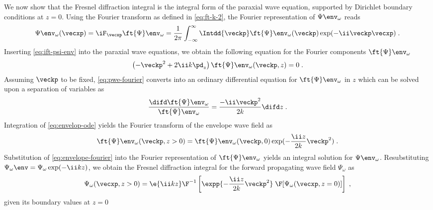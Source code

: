 \documentclass[
twoside,
openright,
titlepage,
numbers=noenddot,
headinclude,
fleqn,
a4paper,
footinclude=true,
cleardoublepage=empty,
abstractoff,
BCOR=5mm,
paper=a4,
fontsize=11pt,
british,ngerman,american,
]{scrreprt}
\begin{document}
We now show that the Fresnel diffraction integral is the integral form
of the paraxial wave equation, supported by Dirichlet boundary
conditions at $z=0$.  Using the Fourier transform as defined in
\cref{eq:ft-k-2}, the Fourier representation of $\Psi\env_{\omega}$
reads
\begin{equation}
  \label{eq:ift-psi-env}
  \Psi\env_{\omega}(\vecxp)  = \iF_{\vecxp} \ft{\Psi}\env_{\omega} = 
  \frac{1}{2\pi}\int_{-\infty}^\infty \Intdd{\veckp} 
  \ft{\Psi}\env_{\omega}(\veckp) \exp(-\ii\veckp\vecxp) \;.
\end{equation}
Inserting \cref{eq:ift-psi-env} into the paraxial wave equations, we
obtain the following equation for the Fourier components
$\ft{\Psi}\env_{\omega}$
\begin{equation}
  \label{eq:pwe-fourier}
  \left( -\veckp^2  +2\ii k\pd_z \right)
  \ft{\Psi}\env_{\omega}(\veckp,z) = 0\;. 
\end{equation}
Assuming $\veckp$ to be fixed, \cref{eq:pwe-fourier} converts into an
ordinary differential equation for $\ft{\Psi}\env_\omega$ in $z$ which
can be solved upon a separation of variables as
\begin{equation}
  \label{eq:envelop-ode}
  \frac{\difd\ft{\Psi}\env_\omega}{\ft{\Psi}\env_\omega} 
  = \frac{-\ii \veckp^2}{2 k} \difd z \;.
\end{equation}
Integration of \cref{eq:envelop-ode} yields the Fourier transform of
the envelope wave field as
\begin{equation}
  \label{eq:envelope-fourier}
  \ft{\Psi}\env_\omega(\veckp,z>0) 
  = \ft{\Psi}\env_\omega(\veckp,0)\exp(-\frac{\ii z}{2 k}\veckp^2) \;.
\end{equation}
Substitution of \cref{eq:envelope-fourier} into the Fourier
representation of $\ft{\Psi}\env_\omega$ yields an integral solution
for $\Psi\env_{\omega}$.  Resubstituting $\Psi_{\omega}\env=
\Psi_{\omega}\exp(-\ii k z)$, we obtain the Fresnel diffraction
integral for the forward propagating wave field $\Psi_{\omega}$ as
\cite{PaganinBook,BornWolf}
\begin{equation}
  \label{eq:fresnel}
  \Psi_{\omega}(\vecxp,z>0) = \e{\ii k z}\F^{-1}
  \left[\expp{-\frac{\ii z}{2k}\veckp^2}\;
    \F[\Psi_{\omega}(\vecxp,z=0)]\right]\;,
\end{equation}
given its boundary values at $z=0$
\end{document}
